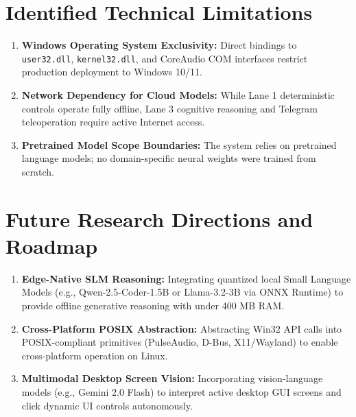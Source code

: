 \documentclass[12pt,letterpaper,oneside]{report}
\begin{document}
\section{Identified Technical Limitations}
\begin{enumerate}
    \item \textbf{Windows Operating System Exclusivity:} Direct bindings to \texttt{user32.dll}, \texttt{kernel32.dll}, and CoreAudio COM interfaces restrict production deployment to Windows 10/11.
    \item \textbf{Network Dependency for Cloud Models:} While Lane 1 deterministic controls operate fully offline, Lane 3 cognitive reasoning and Telegram teleoperation require active Internet access.
    \item \textbf{Pretrained Model Scope Boundaries:} The system relies on pretrained language models; no domain-specific neural weights were trained from scratch.
\end{enumerate}

\section{Future Research Directions and Roadmap}
\begin{enumerate}
    \item \textbf{Edge-Native SLM Reasoning:} Integrating quantized local Small Language Models (e.g., Qwen-2.5-Coder-1.5B or Llama-3.2-3B via ONNX Runtime) to provide offline generative reasoning with under 400 MB RAM.
    \item \textbf{Cross-Platform POSIX Abstraction:} Abstracting Win32 API calls into POSIX-compliant primitives (PulseAudio, D-Bus, X11/Wayland) to enable cross-platform operation on Linux.
    \item \textbf{Multimodal Desktop Screen Vision:} Incorporating vision-language models (e.g., Gemini 2.0 Flash) to interpret active desktop GUI screens and click dynamic UI controls autonomously.
\end{enumerate}
\end{document}
